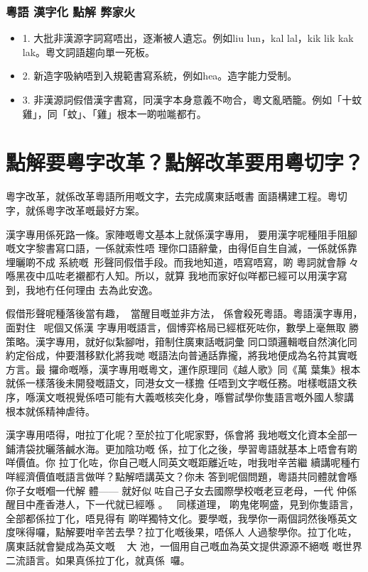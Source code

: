 \documentclass[a5paper, 10pt, openany]{book} %
\begin{document}
\subsection*{粵語 漢字化 點解 弊家火}
\begin{itemize}
  \item[] 1. 大批非漢源字詞寫唔出，逐漸被人遺忘。例如liu lun，kal lal，kik lik kak lak。粵文詞語趨向單一死板。

  \item[] 2. 新造字吸納唔到入規範書寫系統，例如hea。造字能力受制。

  \item[] 3. 非漢源詞假借漢字書寫，同漢字本身意義不吻合，粵文亂晒籠。例如「十蚊雞」，同「蚊」、「雞」根本一啲啦𠹌都冇。
\end{itemize}



\chapter{點解要粵字改革？點解改革要用粵切字？}



粵字改革，就係改革粵語所用嘅文字，去完成廣東話嘅書 面語構建工程。粵切字，就係粵字改革嘅最好方案。

漢字專用係死路一條。家陣嘅粵文基本上就係漢字專用， 要用漢字呢種阻手阻腳嘅文字黎書寫口語，一係就索性唔 理你口語辭彙，由得佢自生自滅，一係就係靠埋曬啲不成 系統嘅形聲同假借手段。而我地知道，唔寫唔寫，啲 粵詞就會靜々喺黑夜中瓜咗老襯都冇人知。所以，就算 我地而家好似咩都已經可以用漢字寫到，我地冇任何理由 去為此安逸。

假借形聲呢種落後當有趣，當醒目嘅並非方法， 係會殺死粵語。粵語漢字專用，面對住呢個又係漢 字專用嘅語言，個博弈格局已經框死咗你，數學上毫無取 勝策略。漢字專用，就好似紮腳咁，箝制住廣東話嘅詞彙 同口頭邏輯嘅自然演化同約定俗成，仲要潛移默化將我哋 嘅語法向普通話靠攏，將我地便成為名符其實嘅方言。最 攞命嘅喺，漢字專用嘅粵文，運作原理同《越人歌》同《萬 葉集》根本就係一樣落後未開發嘅語文，同港女文一樣擔 任唔到文字嘅任務。咁樣嘅語文秩序，喺漢文嘅視覺係唔可能有大義嘅核突化身，喺嘗試學你隻語言嘅外國人黎講 根本就係精神虐待。

漢字專用唔得，咁拉丁化呢？至於拉丁化呢家野，係會將 我地嘅文化資本全部一鋪清袋抌曬落鹹水海。更加陰功嘅 係，拉丁化之後，學習粵語就基本上唔會有啲咩價值。你 拉丁化咗，你自己嘅人同英文嘅距離近咗，咁我咁辛苦繼 續講呢種冇咩經濟價值嘅語言做咩？點解唔講英文？你未 答到呢個問題，粵語共同體就會喺你子女嘅嗰一代解 體—— 就好似咗自己子女去國際學校嘅老豆老母，一代 仲係醒目中產香港人，下一代就已經喺 。同樣道理， 啲鬼佬啊盛，見到你隻語言，全部都係拉丁化，唔見得有 啲咩獨特文化。要學嘅，我學你一兩個詞然後喺英文度咪得囉，點解要咁辛苦去學？拉丁化嘅後果，唔係人 人過黎學你。拉丁化咗，廣東話就會變成為英文嘅 大 池，一個用自己嘅血為英文提供源源不絕嘅 嘅世界 二流語言。如果真係拉丁化，就真係囉。
\end{document}
